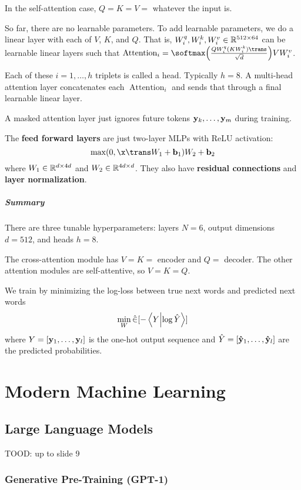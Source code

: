 \documentclass[class=cs480,notes,tikz]{agony}
\begin{document}
In the self-attention case, $Q = K = V = $ whatever the input is.

So far, there are no learnable parameters.
To add learnable parameters, we do a linear layer with each of $V$, $K$, and $Q$.
That is, $W^q_i,W^k_i,W^v_i \in \mathbb{R}^{512 \times 64}$ can be learnable linear layers
such that $\operatorname{Attention}_i = \softmax\qty(\frac{QW^q_i(KW^k_i)\trans}{\sqrt{d}})VW^v_i$.

Each of these $i = 1,\dotsc,h$ triplets is called a head.
Typically $h = 8$.
A multi-head attention layer concatenates each $\operatorname{Attention}_i$
and sends that through a final learnable linear layer.

A masked attention layer just ignores future tokens $\vb y_k,\dotsc,\vb y_m$ during training.

The \textcolor{Cerulean}{\textbf{feed forward layers}} are just two-layer MLPs
with ReLU activation:
\[ \max(0,\x\trans W_1 + \vb b_1)W_2 + \vb b_2 \]
where $W_1 \in \mathbb{R}^{d \times 4d}$ and $W_2 \in \mathbb{R}^{4d \times d}$.
They also have \textcolor{Dandelion}{\textbf{residual connections}}
and \textcolor{Dandelion}{\textbf{layer normalization}}.

\paragraph{Summary}
There are three tunable hyperparameters: layers $N = 6$,
output dimensions $d = 512$, and heads $h = 8$.

The cross-attention module has $V = K = $ encoder and $Q = $ decoder.
The other attention modules are self-attentive, so $V = K = Q$.

We train by minimizing the log-loss between true next words and predicted next words
\[ \min_W \hat{\E}[-\ip{Y}{\log\hat Y}] \]
where $Y = [\vb y_1,\dotsc,\vb y_l]$ is the one-hot output sequence
and $\hat Y = [\vb{\hat{y}}_1,\dotsc,\vb{\hat{y}}_l]$ are the predicted probabilities.

\chapter{Modern Machine Learning}

\section{Large Language Models}

TOOD: up to slide 9

\subsection*{Generative Pre-Training (GPT-1)}
\end{document}
